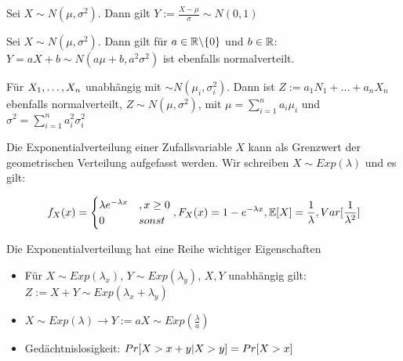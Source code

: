 \begin{satz}
	Sei $X \sim N(\mu, \sigma^2)$. Dann gilt $Y := \frac{X - \mu}{\sigma} \sim N(0,1)$
\end{satz}

\begin{satz}
	Sei $X \sim N(\mu, \sigma^2)$. Dann gilt für $a \in \mathbb{R} \backslash \{0\}$ und $b \in \mathbb{R}$: $Y = aX + b \sim N(a\mu + b, a^2 \sigma^2)$ ist ebenfalls normalverteilt.
\end{satz}

\begin{satz}
	Für $X_1, \dots, X_n$ unabhängig mit $\sim N(\mu_i,\sigma_i^2)$. Dann ist $Z := a_1N_1 + ... + a_nX_n$  ebenfalls normalverteilt, $Z \sim N(\mu, \sigma^2)$, mit $\mu = \sum_{i=1}^na_i\mu_i$ und $\sigma^2 = \sum_{i=1}^{n} a_i^2\sigma_i^2$        
\end{satz}

\begin{definition}[Exponentialverteilung]
	Die Exponentialverteilung einer Zufallsvariable $X$ kann als Grenzwert der geometrischen Verteilung aufgefasst werden. Wir schreiben $X \sim Exp(\lambda)$ und es gilt:
	
	\begin{align*}
		f_X(x) = \begin{cases}
			\lambda e^{-\lambda x} &, x \geq 0 \\
			0 & sonst
		\end{cases}, F_X(x) = 1 - e^{-\lambda x}, \mathbb{E}[X] = \frac{1}{\lambda}, Var[\frac{1}{\lambda^2}]
	\end{align*}
	 
\end{definition}

\begin{satz} Die Exponentialverteilung hat eine Reihe wichtiger Eigenschaften
	\begin{itemize}[noitemsep]
		\item Für $X \sim Exp(\lambda_x)$, $Y \sim Exp(\lambda_y)$, $X,Y$ unabhängig gilt: $Z := X + Y \sim Exp(\lambda_x + \lambda_y)$
		\item $X \sim Exp(\lambda) \rightarrow Y := aX \sim Exp(\frac{\lambda}{a})$ 
		\item Gedächtnislosigkeit: $Pr[X > x + y | X > y] = Pr[X > x]$
	\end{itemize}
\end{satz}


